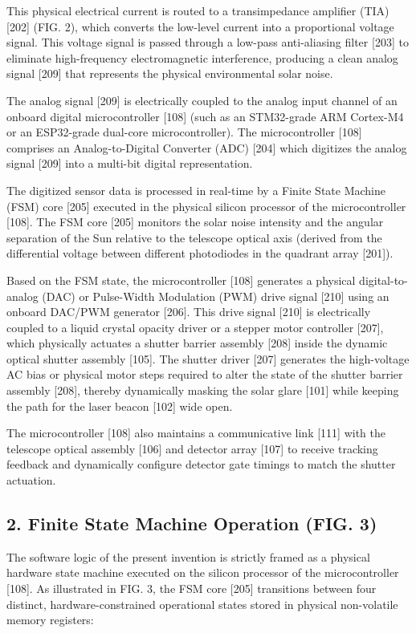 \documentclass[12pt,a4paper]{article}
\begin{document}
This physical electrical current is routed to a transimpedance amplifier (TIA) [202] (FIG. 2), which converts the low-level current into a proportional voltage signal. This voltage signal is passed through a low-pass anti-aliasing filter [203] to eliminate high-frequency electromagnetic interference, producing a clean analog signal [209] that represents the physical environmental solar noise.

The analog signal [209] is electrically coupled to the analog input channel of an onboard digital microcontroller [108] (such as an STM32-grade ARM Cortex-M4 or an ESP32-grade dual-core microcontroller). The microcontroller [108] comprises an Analog-to-Digital Converter (ADC) [204] which digitizes the analog signal [209] into a multi-bit digital representation.

The digitized sensor data is processed in real-time by a Finite State Machine (FSM) core [205] executed in the physical silicon processor of the microcontroller [108]. The FSM core [205] monitors the solar noise intensity and the angular separation of the Sun relative to the telescope optical axis (derived from the differential voltage between different photodiodes in the quadrant array [201]).

Based on the FSM state, the microcontroller [108] generates a physical digital-to-analog (DAC) or Pulse-Width Modulation (PWM) drive signal [210] using an onboard DAC/PWM generator [206]. This drive signal [210] is electrically coupled to a liquid crystal opacity driver or a stepper motor controller [207], which physically actuates a shutter barrier assembly [208] inside the dynamic optical shutter assembly [105]. The shutter driver [207] generates the high-voltage AC bias or physical motor steps required to alter the state of the shutter barrier assembly [208], thereby dynamically masking the solar glare [101] while keeping the path for the laser beacon [102] wide open.

The microcontroller [108] also maintains a communicative link [111] with the telescope optical assembly [106] and detector array [107] to receive tracking feedback and dynamically configure detector gate timings to match the shutter actuation.

\subsection*{2. Finite State Machine Operation (FIG. 3)}
The software logic of the present invention is strictly framed as a physical hardware state machine executed on the silicon processor of the microcontroller [108]. As illustrated in FIG. 3, the FSM core [205] transitions between four distinct, hardware-constrained operational states stored in physical non-volatile memory registers:
\end{document}
